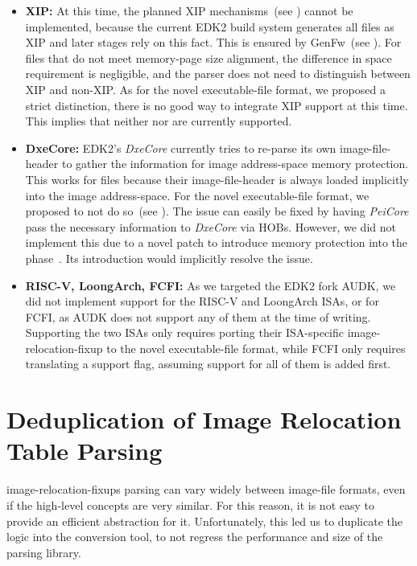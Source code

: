 \begin{itemize}
  \item \textbf{\gls{XIP}:} At this time, the planned \gls{XIP} mechanisms~(see ) cannot be implemented, because the current \gls{EDK2} build system generates all  files as \gls{XIP} and later stages rely on this fact. This is ensured by GenFw~(see ). For  files that do not meet \gls{memory-page} size alignment, the difference in space requirement is negligible, and the parser does not need to distinguish between \gls{XIP} and non-\gls{XIP}. As for the novel \gls{executable-file} format, we proposed a strict distinction, there is no good way to integrate \gls{XIP} support at this time. This implies that neither  nor  are currently supported.
  \item \textbf{DxeCore:} \Gls{EDK2}'s \textit{DxeCore} currently tries to re-parse its own \gls{image-file-header} to gather the information for \gls{image} \gls{address-space} memory protection. This works for  files because their \gls{image-file-header} is always loaded implicitly into the \gls{image} \gls{address-space}. For the novel \gls{executable-file} format, we proposed to not do so~(see ). The issue can easily be fixed by having \textit{PeiCore} pass the necessary information to \textit{DxeCore} via \glspl{HOB}. However, we did not implement this due to a novel patch to introduce memory protection into the  phase~\cite{pei-mem-perms}. Its introduction would implicitly resolve the issue.
  \item \textbf{RISC-V, LoongArch, \gls{FCFI}:} As we targeted the \gls{EDK2} fork \gls{AUDK}, we did not implement support for the RISC-V and LoongArch \glspl{ISA}, or for \gls{FCFI}, as \gls{AUDK} does not support any of them at the time of writing. Supporting the two \glspl{ISA} only requires porting their \gls{ISA}-specific \gls{image-relocation-fixup} to the novel \gls{executable-file} format, while \gls{FCFI} only requires translating a support flag, assuming  support for all of them is added first.
\end{itemize}

\section{Deduplication of Image Relocation Table Parsing}
\label{sec:reloc_dedupe}

\Glspl{image-relocation-fixup} parsing can vary widely between \gls{image-file} formats, even if the high-level concepts are very similar. For this reason, it is not easy to provide an efficient abstraction for it. Unfortunately, this led us to duplicate the logic into the conversion tool, to not regress the performance and size of the parsing \gls{library}.

